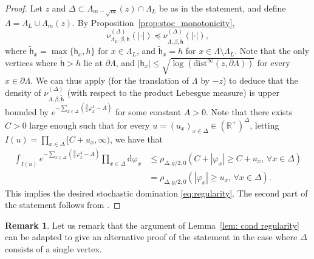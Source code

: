 \documentclass[11pt,a4paper]{article}
\theoremstyle{definition}
\newtheorem{remark}[theorem]{Remark}
\numberwithin{equation}{section}
\begin{document}
\begin{proof}
Let $z$ and $\Delta\subset\Lambda_{m-\sqrt{m}}(z)\cap \Lambda_L$ be as in the statement, and define $\Lambda=\Lambda_L\cup\Lambda_m(z)$. By Proposition~\ref{prop:stoc_monotonicity}, 
\begin{equation}
\nu^{(\Delta)}_{\Lambda_L, \beta, \mathsf h} (|\cdot|)\preccurlyeq \nu^{(\Delta)}_{\Lambda, \beta, \tilde{\mathsf h}} (|\cdot|),    
\end{equation}
where $\tilde{\mathsf{h}}_x=\max\{\mathsf{h}_x,h\}$ for $x\in \Lambda_L$, and $\tilde{\mathsf{h}}_x=h$ for $x\in \Lambda\setminus \Lambda_L$. Note that the only vertices where $\tilde{\mathsf{h}}>h$ lie at $\partial \Lambda$, and $|\mathsf{h}_x|\leq \sqrt{\log (\mathrm{dist}^\infty(z,\partial \Lambda))}$ for every $x\in \partial \Lambda$.
We can thus apply \cite[Corollary D.12]{GunaratnamPanagiotisPanisSeveroPhi42022} (for the translation of $\Lambda$ by $-z$) to deduce that the density of $\nu^{(\Delta)}_{\Lambda, \beta, \tilde{\mathsf h}}$ (with respect to the product Lebesgue measure) is upper bounded by $e^{-\sum_{x\in \Delta}(\frac{g}{2} \varphi^4_x-A)}$ for some constant $A>0$. 
Note that there exists $C>0$ large enough such that for every $u=(u_x)_{x \in \Delta} \in (\mathbb R^+)^\Delta$, letting $I(u)=\prod_{x \in \Delta}[C+u_x,\infty)$, we have that 
\begin{equation}
\begin{aligned}
\int_{I(u)}e^{-\sum_{x \in \Delta}(\frac{g}{2} \varphi^4_x-A)} \prod_{x\in \Delta}\mathrm{d}\varphi_x&\leq \rho_{\Delta,g/2,0}(C+|\varphi_x|\geq C+u_x ,\, \forall x\in \Delta) \\ &= \rho_{\Delta,g/2,0}(|\varphi_x|\geq u_x ,\, \forall x\in \Delta).  
\end{aligned}
\end{equation}
This implies the desired stochastic domination \eqref{eq:regularity}. The second part of the statement follows from \cite[Remark D.13]{GunaratnamPanagiotisPanisSeveroPhi42022}.
\end{proof}

\begin{remark}Let us remark that the argument of Lemma~\textup{\ref{lem: cond regularity}} can be adapted to give an alternative proof of the statement in the case where $\Delta$ consists of a single vertex.
\end{remark}
\end{document}
